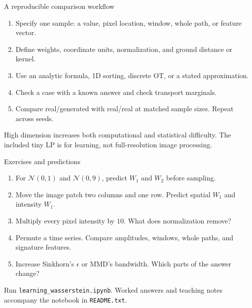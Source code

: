 \documentclass[aspectratio=169,11pt]{beamer}
\begin{document}
\begin{frame}{A reproducible comparison workflow}
\begin{enumerate}\setlength\itemsep{4mm}
\item Specify one sample: a value, pixel location, window, whole path, or feature vector.
\item Define weights, coordinate units, normalization, and ground distance or kernel.
\item Use an analytic formula, 1D sorting, discrete OT, or a stated approximation.
\item Check a case with a known answer and check transport marginals.
\item Compare real/generated with real/real at matched sample sizes. Repeat across seeds.
\end{enumerate}
\vspace{3mm}
\small High dimension increases both computational and statistical difficulty. The included tiny LP is for learning, not full-resolution image processing.
\end{frame}

\begin{frame}{Exercises and predictions}
\begin{enumerate}\setlength\itemsep{4mm}
\item For $\mathcal N(0,1)$ and $\mathcal N(0,9)$, predict $W_1$ and $W_2$ before sampling.
\item Move the image patch two columns and one row. Predict spatial $W_1$ and intensity $W_1$.
\item Multiply every pixel intensity by $10$. What does normalization remove?
\item Permute a time series. Compare amplitudes, windows, whole paths, and signature features.
\item Increase Sinkhorn's $\epsilon$ or MMD's bandwidth. Which parts of the answer change?
\end{enumerate}
\vspace{3mm}
\small Run \texttt{learning\_wasserstein.ipynb}. Worked answers and teaching notes accompany the notebook in \texttt{README.txt}.
\end{frame}
\end{document}
